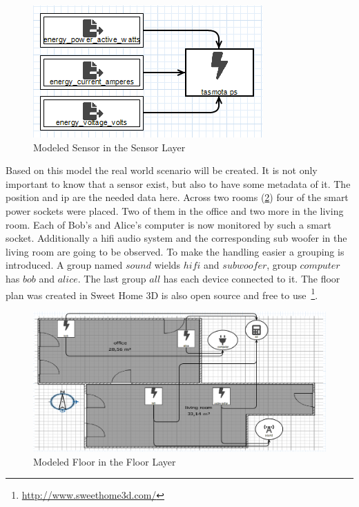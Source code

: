\begin{figure}[!ht]
	\centering
	\includegraphics[width=.7\linewidth]{assets/images/sensorLayer}
	\caption{Modeled Sensor in the Sensor Layer}
	\label{fig:modeled_sensor_layer}
\end{figure}

Based on this model the real world scenario will be created. It is not only important to know that a sensor exist, but also to have some metadata of it. The position and ip are the needed data here. Across two rooms (\cref{fig:modeled_floor_layer}) four of the smart power sockets were placed. Two of them in the office and two more in the living room. Each of Bob's and Alice's computer is now monitored by such a smart socket. Additionally a \gls{hifi} audio system and the corresponding sub woofer in the living room are going to be observed. To make the handling easier a grouping is introduced. A group named $sound$ wields $hifi$ and $subwoofer$, group $computer$ has $bob$ and $alice$. The last group $all$ has each device connected to it. The floor plan was created in Sweet Home 3D is also open source and free to use~\footnote{\url{http://www.sweethome3d.com/}}. 

\begin{figure}[!ht]
	\centering
	\includegraphics[width=\linewidth]{assets/images/floorLayer}
	\caption{Modeled Floor in the Floor Layer}
	\label{fig:modeled_floor_layer}
\end{figure}

